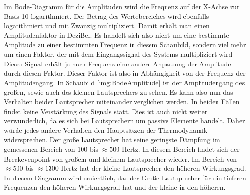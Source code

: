 Im Bode-Diagramm für die Amplituden wird die Frequenz auf der X-Achse zur Basis 10 logarithmiert. Der Betrag des Wertebereiches wird ebenfalls logarithmiert und mit Zwanzig multipliziert. Damit erhält man einen Amplitudenfaktor in DeziBel. Es handelt sich also nicht um eine bestimmte Amplitude zu einer bestimmten Frequenz in diesem Schaubild, sondern viel mehr um einen Faktor, der mit dem Eingangssignal des Systems multipliziert wird. Dieses Signal erhält je nach Frequenz eine andere Anpassung der Amplitude durch diesen Faktor. Dieser Faktor ist also in Abhängigkeit von der Frequenz der Amplitudengang.
In Schaubild \ref{img:BodeAmplitude} ist der Amplitudengang des großen, sowie auch des kleinen Lautsprechers zu sehen.
Es kann also nun das Verhalten beider Lautsprecher miteinander verglichen werden. In beiden Fällen findet keine Verstärkung des Signals statt. Dies ist auch nicht weiter verwunderlich, da es sich bei Lautsprechern um passive Elemente handelt. Daher würde jedes andere Verhalten den Hauptsätzen der Thermodynamik widersprechen.
Der große Lautsprecher hat seine geringste Dämpfung im gemessenen Bereich von 100 bis $\approx 500$ Hertz. In diesem Bereich findet sich der Breakevenpoint von großem und kleinem Lautsprecher wieder. Im Bereich von $\approx 500$ bis $\approx 1300$ Hertz hat der kleine Lautsprecher den höheren Wirkungsgrad. In diesem Diagramm wird ersichtlich, das der Große Lautsprecher für die tieferen Frequenzen den höheren Wirkungsgrad hat und der kleine in den höheren.



